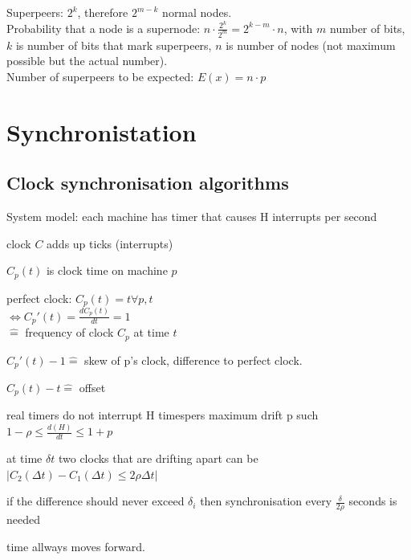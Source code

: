 \documentclass[ngerman,a4paper]{report}
\begin{document}
Superpeers: $2^k$, therefore $2^{m-k}$ normal nodes.\\
Probability that a node is a supernode: $n\cdot \frac{2^k}{2^m} = 2^{k-m} \cdot n$, with $m$ number of bits, $k$ is number of bits that mark superpeers, $n$ is number of nodes (not maximum possible but the actual number).\\
Number of superpeers to be expected: $E(x)= n\cdot p$\\

\chapter{Synchronistation}
\section{Clock synchronisation algorithms}
System model: each machine has timer that causes H interrupts per second
\begin{compactitem}
	\item clock $C$ adds up ticks (interrupts)
	\item $C_p(t)$ is clock time on machine $p$
	\item perfect clock: $C_p(t) = t \forall p, t$ \\
	$\Longleftrightarrow C_p'(t) = \frac{d C_p(t)}{dt} = 1$\\
	$\mathrel{\widehat{=}}$ frequency of clock $C_p$ at time $t$
	\item $C_p'(t) - 1 \mathrel{\widehat{=}}$ skew of p's clock, difference to perfect clock.
	\item $C_p(t)-t \mathrel{\widehat{=}}$ offset
	\item real timers do not interrupt H timespers maximum drift p such\\
	$1-\rho \leq \frac {d(H)}{dt} \leq 1+p$
	\item at time $\delta t$ two clocks that are drifting apart can be\\
	$|C_2(\Delta t) - C_1(\Delta t) \leq 2 \rho \Delta t|$
	\item if the difference should never exceed $\delta_i$ then synchronisation every $\frac {\delta}{2 \rho}$ seconds is needed
	\item time allways moves forward.
\end{compactitem}
\end{document}

